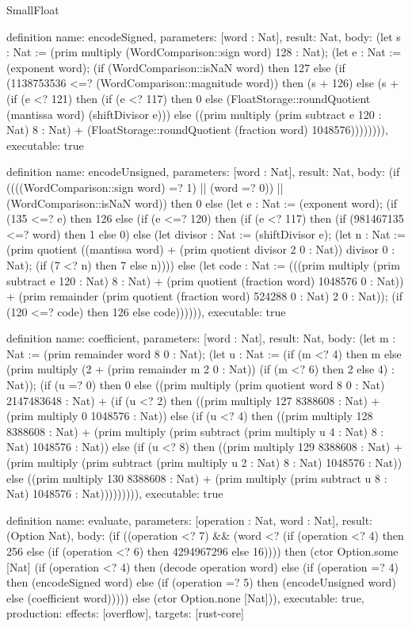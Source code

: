 \begin{lexlean}{SmallFloat}
\begin{semanticmodule}
definition{
  name: encodeSigned,
  parameters: [word : Nat],
  result: Nat,
  body: (let s : Nat := (prim multiply (WordComparison::sign word) 128 : Nat); (let e : Nat := (exponent word); (if (WordComparison::isNaN word) then 127 else (if (1138753536 <=? (WordComparison::magnitude word)) then (s + 126) else (s + (if (e <? 121) then (if (e <? 117) then 0 else (FloatStorage::roundQuotient (mantissa word) (shiftDivisor e))) else ((prim multiply (prim subtract e 120 : Nat) 8 : Nat) + (FloatStorage::roundQuotient (fraction word) 1048576)))))))),
  executable: true
}

definition{
  name: encodeUnsigned,
  parameters: [word : Nat],
  result: Nat,
  body: (if ((((WordComparison::sign word) =? 1) || (word =? 0)) || (WordComparison::isNaN word)) then 0 else (let e : Nat := (exponent word); (if (135 <=? e) then 126 else (if (e <=? 120) then (if (e <? 117) then (if (981467135 <=? word) then 1 else 0) else (let divisor : Nat := (shiftDivisor e); (let n : Nat := (prim quotient ((mantissa word) + (prim quotient divisor 2 0 : Nat)) divisor 0 : Nat); (if (7 <? n) then 7 else n)))) else (let code : Nat := (((prim multiply (prim subtract e 120 : Nat) 8 : Nat) + (prim quotient (fraction word) 1048576 0 : Nat)) + (prim remainder (prim quotient (fraction word) 524288 0 : Nat) 2 0 : Nat)); (if (120 <=? code) then 126 else code)))))),
  executable: true
}

definition{
  name: coefficient,
  parameters: [word : Nat],
  result: Nat,
  body: (let m : Nat := (prim remainder word 8 0 : Nat); (let u : Nat := (if (m <? 4) then m else (prim multiply (2 + (prim remainder m 2 0 : Nat)) (if (m <? 6) then 2 else 4) : Nat)); (if (u =? 0) then 0 else ((prim multiply (prim quotient word 8 0 : Nat) 2147483648 : Nat) + (if (u <? 2) then ((prim multiply 127 8388608 : Nat) + (prim multiply 0 1048576 : Nat)) else (if (u <? 4) then ((prim multiply 128 8388608 : Nat) + (prim multiply (prim subtract (prim multiply u 4 : Nat) 8 : Nat) 1048576 : Nat)) else (if (u <? 8) then ((prim multiply 129 8388608 : Nat) + (prim multiply (prim subtract (prim multiply u 2 : Nat) 8 : Nat) 1048576 : Nat)) else ((prim multiply 130 8388608 : Nat) + (prim multiply (prim subtract u 8 : Nat) 1048576 : Nat))))))))),
  executable: true
}

definition{
  name: evaluate,
  parameters: [operation : Nat, word : Nat],
  result: (Option Nat),
  body: (if ((operation <? 7) && (word <? (if (operation <? 4) then 256 else (if (operation <? 6) then 4294967296 else 16)))) then (ctor Option.some [Nat] (if (operation <? 4) then (decode operation word) else (if (operation =? 4) then (encodeSigned word) else (if (operation =? 5) then (encodeUnsigned word) else (coefficient word))))) else (ctor Option.none [Nat])),
  executable: true,
  production: {effects: [overflow], targets: [rust-core]}
}


\end{semanticmodule}
\end{lexlean}
